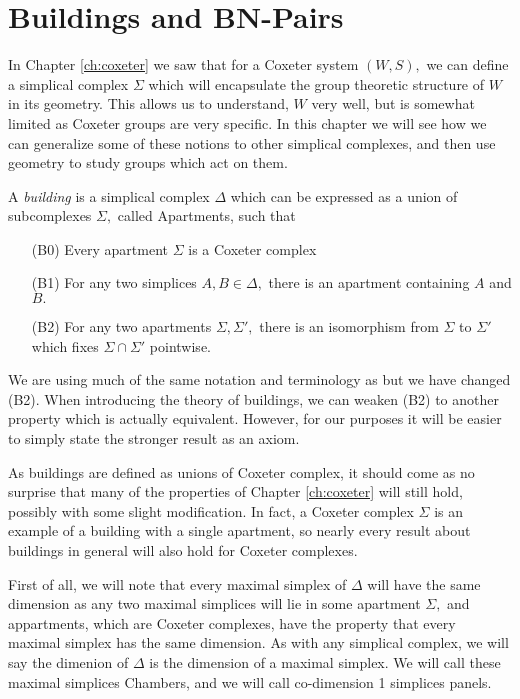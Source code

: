 \documentclass[class=book, crop=false,12 pt]{standalone}
\begin{document}
\chapter{Buildings and BN-Pairs}
\label{ch:building}
In Chapter \ref{ch:coxeter} we saw that for a Coxeter system $(W,S),$ we can define a simplical complex $\Sigma$ which will encapsulate the group theoretic structure of $W$ in its geometry. This allows us to understand, $W$ very well, but is somewhat limited as Coxeter groups are very specific. In this chapter we will see how we can generalize some of these notions to other simplical complexes, and then use geometry to study groups which act on them.

\begin{defn}
	\label{defn:building}
	A \emph{building} is a simplical complex $\Delta$ which can be expressed as a union of subcomplexes $\Sigma,$ called Apartments, such that
	\begin{itemize}
		\item[(B0)] Every apartment $\Sigma$ is a Coxeter complex
		\item[(B1)] For any two simplices $A,B\in \Delta,$ there is an apartment containing $A$ and $B.$
		\item[(B2)] For any two apartments $\Sigma,\Sigma',$ there is an isomorphism from $\Sigma$ to $\Sigma'$ which fixes $\Sigma\cap \Sigma'$ pointwise.
	\end{itemize}
\end{defn}

We are using much of the same notation and terminology as \cite{buildings} but we have changed (B2). When introducing the theory of buildings, we can weaken (B2) to another property which is actually equivalent. However, for our purposes it will be easier to simply state the stronger result as an axiom.

As buildings are defined as unions of Coxeter complex, it should come as no surprise that many of the properties of Chapter \ref{ch:coxeter} will still hold, possibly with some slight modification. In fact, a Coxeter complex $\Sigma$ is an example of a building with a single apartment, so nearly every result about buildings in general will also hold for Coxeter complexes.

First of all, we will note that every maximal simplex of $\Delta$ will have the same dimension as any two maximal simplices will lie in some apartment $\Sigma,$ and appartments, which are Coxeter complexes, have the property that every maximal simplex has the same dimension. As with any simplical complex, we will say the dimenion of $\Delta$ is the dimension of a maximal simplex. We will call these maximal simplices Chambers, and we will call co-dimension 1 simplices panels.
\end{document}
